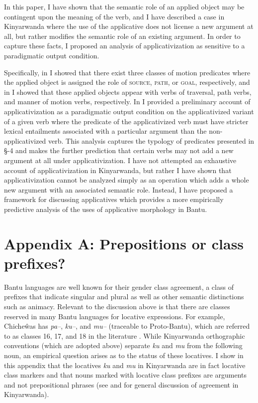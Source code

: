 \documentclass[output=paper]{langsci/langscibook}
\begin{document}
In this paper, I have shown that the semantic role of an applied object may be contingent upon the meaning of the verb, and I have described a case in Kinyarwanda where the use of the applicative does not license a new argument at all, but rather modifies the semantic role of an existing argument. In order to capture these facts, I proposed an analysis of applicativization as sensitive to a paradigmatic output condition. 
 
Specifically, in  I showed that there exist three classes of motion predicates where the applied object is assigned the role of {\scshape source, path,} or {\scshape goal,} respectively, and in  I showed that  these applied objects appear with verbs of traversal, path verbs, and manner of motion verbs, respectively. In  I provided a preliminary account of applicativization as a paradigmatic output condition on the applicativized variant of a given verb where the predicate of the applicativized verb must have stricter lexical entailments associated with a particular argument than the non-applicativized verb. This analysis captures the typology of predicates presented in \S{}-4 and makes the further prediction that certain verbs may not add a new argument at all under applicativization. I have not attempted an exhaustive account of applicativization in Kinyarwanda, but rather I have shown that applicativization cannot be analyzed simply as an operation which adds a whole new argument with an associated semantic role. Instead, I have proposed a framework for discussing applicatives which provides a more empirically predictive analysis of the uses of applicative morphology in Bantu. 
 
 
 \section*{Appendix A: Prepositions or class prefixes?}
 
 Bantu languages are well known for their gender class agreement, a class of prefixes that indicate singular and plural as well as other semantic distinctions such as animacy. Relevant to the discussion above is that there are classes reserved in many Bantu languages for locative expressions. For example, Chicheŵas has \emph{pa--}, \emph{ku--}, and \emph{mu--} (traceable to Proto-Bantu), which are referred to as classes 16, 17, and 18 in the literature \citep{BresnanKanerva1989,bresnan:1994,bresnanmchombo:1995,maho:1999}. While Kinyarwanda orthographic conventions (which are adopted above) separate \emph{ku} and \emph{mu} from the following noun, an empirical question arises as to the status of these locatives. I show in this appendix that the locatives \emph{ku} and \emph{mu} in Kinyarwanda are in fact locative class markers and that nouns marked with locative class prefixes are arguments and not prepositional phrases (see \citealt{Jerro2013} and \citealt{JerroWechsler2015} for general discussion of agreement in Kinyarwanda).
 
\end{document}
